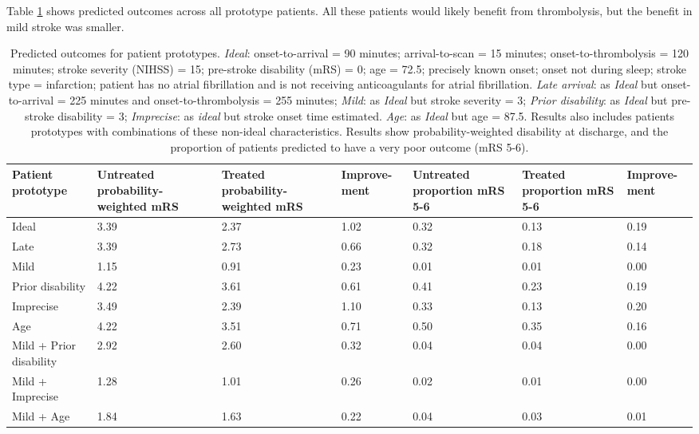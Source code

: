 Table \ref{tab:prototype_outcomes} shows predicted outcomes across all prototype patients. All these patients would likely benefit from thrombolysis, but the benefit in mild stroke was smaller.

\begin{minipage}{1\textwidth}
\small
\begin{longtable}{p{5.2cm} | p{1.6cm} p{1.6cm} p{1.5cm} | p{1.6cm} p{1.6cm} p{1.5cm}}
\caption{Predicted outcomes for patient prototypes. \textit{Ideal}: onset-to-arrival = 90 minutes; arrival-to-scan = 15 minutes; onset-to-thrombolysis = 120 minutes; stroke severity (NIHSS) = 15; pre-stroke disability (mRS) = 0; age = 72.5; precisely known onset; onset not during sleep; stroke type = infarction; patient has no atrial fibrillation and is not receiving anticoagulants for atrial fibrillation. \textit{Late arrival}: as \textit{Ideal} but onset-to-arrival = 225 minutes and onset-to-thrombolysis = 255 minutes; \textit{Mild}: as \textit{Ideal} but stroke severity = 3; \textit{Prior disability}: as \textit{Ideal} but pre-stroke disability = 3; \textit{Imprecise}: as \textit{ideal} but stroke onset time estimated. \textit{Age}: as \textit{Ideal} but age = 87.5. Results also includes patients prototypes with combinations of these non-ideal characteristics. Results show probability-weighted disability at discharge, and the proportion of patients predicted to have a very poor outcome (mRS 5-6).}\\
\label{tab:prototype_outcomes}
Patient prototype & Untreated probability-weighted mRS & Treated probability-weighted mRS & Improve-ment & Untreated proportion mRS 5-6 & Treated proportion mRS 5-6 & Improve-ment\\
\endhead
\midrule
Ideal & 3.39 & 2.37 & 1.02 & 0.32 & 0.13 & 0.19\\
Late & 3.39 & 2.73 & 0.66 & 0.32 & 0.18 & 0.14\\
Mild & 1.15 & 0.91 & 0.23 & 0.01 & 0.01 & 0.00\\
Prior disability & 4.22 & 3.61 & 0.61 & 0.41 & 0.23 & 0.19\\
Imprecise & 3.49 & 2.39 & 1.10 & 0.33 & 0.13 & 0.20\\
Age & 4.22 & 3.51 & 0.71 & 0.50 & 0.35 & 0.16\\
Mild + Prior disability & 2.92 & 2.60 & 0.32 & 0.04 & 0.04 & 0.00\\
Mild + Imprecise & 1.28 & 1.01 & 0.26 & 0.02 & 0.01 & 0.00\\
Mild + Age & 1.84 & 1.63 & 0.22 & 0.04 & 0.03 & 0.01\\

\end{longtable}
\end{minipage}
